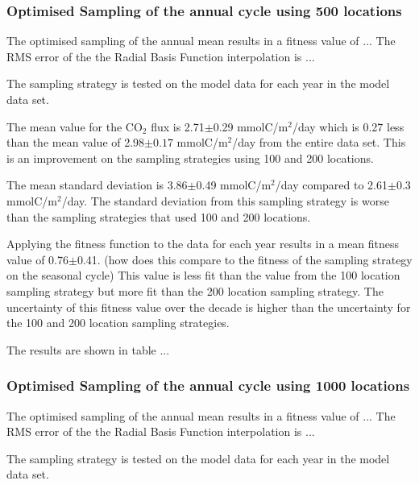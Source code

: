 \documentclass[11pt, a4paper]{article}
\numberwithin{figure}{section}
\numberwithin{table}{section}
\begin{document}


\subsubsection{Optimised Sampling of the annual cycle using 500 locations}
The optimised sampling of the annual mean results in a fitness value
of ...
The RMS error of the the Radial Basis Function interpolation is ...

The sampling strategy is tested on the model data for each year in the
model data set.

The mean value for the CO$_2$ flux is 2.71$\pm$0.29 mmolC/m$^2$/day 
which is 0.27 less than the mean value of 2.98$\pm0.17$ mmolC/m$^2$/day
from the entire data set. This is an improvement on the sampling strategies
using 100 and 200 locations.

The mean standard deviation is 3.86$\pm$0.49 mmolC/m$^2$/day
compared to 2.61$\pm$0.3 mmolC/m$^2$/day. The standard deviation from 
this sampling strategy is worse than the sampling strategies 
that used 100 and 200 locations. 

Applying the fitness function to the data for each year results in a
mean fitness value of 0.76$\pm$0.41. 
(how does this compare to the fitness of the sampling strategy on the
seasonal cycle)
This value is less fit than the value from the 100 location sampling
strategy but more fit than the 200 location sampling strategy.
The uncertainty of this fitness value over the decade is higher than
the uncertainty for the 100 and 200 location sampling strategies.

The results are shown in table ...



\subsubsection{Optimised Sampling of the annual cycle using 1000 locations}
The optimised sampling of the annual mean results in a fitness value
of ...
The RMS error of the the Radial Basis Function interpolation is ...

The sampling strategy is tested on the model data for each year in the
model data set.
\end{document}
